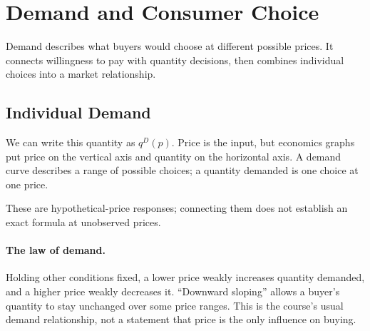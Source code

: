 \section{Demand and Consumer Choice}
Demand describes what buyers would choose at different possible prices.
It connects willingness to pay with quantity decisions, then combines
individual choices into a market relationship.

\subsection{Individual Demand}
We can write this quantity as $q^D(p)$. Price is the input, but economics
graphs put price on the vertical axis and quantity on the horizontal axis.
A demand curve describes a range of possible choices; a quantity demanded
is one choice at one price.

These are hypothetical-price responses; connecting them does not
establish an exact formula at unobserved prices.

\paragraph{The law of demand.}
Holding other conditions fixed, a lower price weakly increases quantity
demanded, and a higher price weakly decreases it. ``Downward sloping''
allows a buyer's quantity to stay unchanged over some price ranges.
This is the course's usual demand relationship, not a statement that price
is the only influence on buying.

